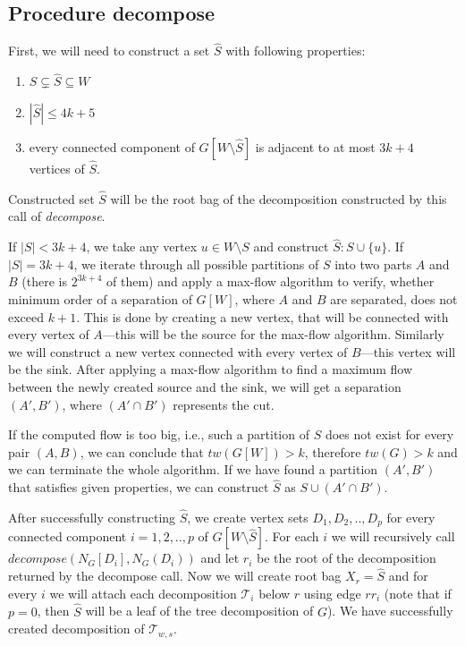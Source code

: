 \documentclass[thesis=B,english]{FITthesis}[2019/03/21]
\begin{document}
\subsection{Procedure decompose} \label{ssec:procedure_decompose}
First, we will need to construct a set $\widehat{S}$ with following properties:
\begin{enumerate}
	\item $S \subsetneq \widehat{S} \subseteq W$
	\item $|\widehat{S}| \leq 4k + 5$
	\item every connected component of $G[W \setminus \widehat{S}]$ is adjacent to at most $3k+4$ vertices of $\widehat{S}$.
\end{enumerate}
Constructed set $\widehat{S}$ will be the root bag of the decomposition constructed by this call of \emph{decompose}.

If $|S| < 3k+4$, we take any vertex $u \in W \setminus S$ and construct $\widehat{S}: S \cup \{u\}$. If $|S| = 3k+4$, we iterate through all possible partitions of $S$ into two parts $A$ and $B$ (there is $2^{3k+4}$ of them) and apply a max-flow algorithm to verify, whether minimum order of a separation of $G[W]$, where $A$ and $B$ are separated, does not exceed $k+1$. This is done by creating a new vertex, that will be connected with every vertex  of $A$---this will be the source for the max-flow algorithm. Similarly we will construct a new vertex connected with every vertex of $B$---this vertex will be the sink. After applying a max-flow algorithm to find a maximum flow between the newly created source and the sink, we will get a separation $(A',B')$, where $(A' \cap B')$ represents the cut.

If the computed flow is too big, i.e., such a partition of $S$ does not exist for every pair $(A,B)$, we can conclude that $tw(G[W]) > k$, therefore $tw(G) > k$ and we can terminate the whole algorithm. If we have found a partition $(A', B')$ that satisfies given properties, we can construct $\widehat{S}$ as $S \cup (A' \cap B')$.

After successfully constructing $\widehat{S}$, we create vertex sets $D_1,D_2,..,D_p$ for every connected component $i=1,2,..,p$ of $G[W \setminus \widehat{S}]$. For each $i$ we will recursively call $decompose(N_G[D_i], N_G(D_i))$ and let $r_i$ be the root of the decomposition returned by the decompose call. Now we will create root bag $X_r = \widehat{S}$ and for every $i$ we will attach each decomposition $\mathcal{T}_i$ below $r$ using edge $rr_i$ (note that if $p = 0$, then $\widehat{S}$ will be a leaf of the tree decomposition of $G$). We have successfully created decomposition of $\mathcal{T}_{w,s}$.
\end{document}
